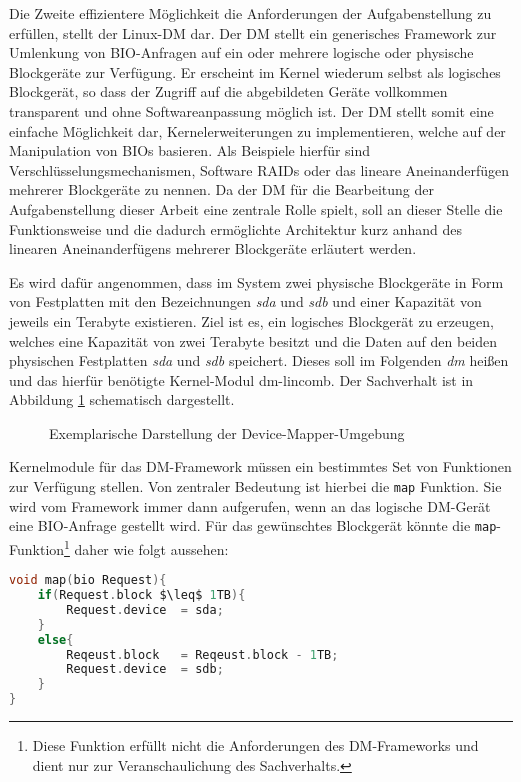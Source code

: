 Die Zweite effizientere Möglichkeit die Anforderungen der Aufgabenstellung zu erfüllen, stellt der Linux-\ac{DM} dar. Der \ac{DM} stellt ein generisches
Framework zur Umlenkung von \ac{BIO}-Anfragen auf ein oder mehrere logische oder physische Blockgeräte zur Verfügung. Er erscheint im Kernel wiederum selbst als logisches
Blockgerät, so dass der Zugriff auf die abgebildeten Geräte vollkommen transparent und ohne Softwareanpassung möglich ist. Der \ac{DM} stellt somit eine einfache
Möglichkeit dar, Kernelerweiterungen zu implementieren, welche auf der Manipulation von \acp{BIO} basieren. Als Beispiele hierfür sind
Verschlüsselungsmechanismen, Software \acp{RAID} oder das lineare Aneinanderfügen mehrerer Blockgeräte zu nennen. Da der \ac{DM} für die Bearbeitung der
Aufgabenstellung dieser Arbeit eine zentrale Rolle spielt, soll an dieser Stelle die Funktionsweise und die dadurch ermöglichte Architektur kurz anhand des
linearen Aneinanderfügens mehrerer Blockgeräte erläutert werden.

Es wird dafür angenommen, dass im System zwei physische Blockgeräte in Form von Festplatten mit den Bezeichnungen \textit{sda} und \textit{sdb} und einer
Kapazität von jeweils ein Terabyte existieren. Ziel ist es, ein logisches Blockgerät zu erzeugen, welches eine Kapazität von zwei Terabyte besitzt und die Daten auf den
beiden physischen Festplatten \textit{sda} und \textit{sdb} speichert. Dieses soll im Folgenden \textit{dm} heißen und das hierfür benötigte Kernel-Modul dm-lincomb. Der
Sachverhalt ist in Abbildung \ref{img:dm1} schematisch dargestellt. 

\begin{figure}[H]\centering
    \caption[Exemplarische Darstellung der Device-Mapper-Umgebung]{Exemplarische Darstellung der Device-Mapper-Umgebung}
    \label{img:dm1}
\end{figure}

Kernelmodule für das \ac{DM}-Framework müssen ein bestimmtes Set von Funktionen zur Verfügung
stellen. Von zentraler Bedeutung ist hierbei die \texttt{map} Funktion. Sie wird vom Framework immer dann aufgerufen, wenn an das logische \ac{DM}-Gerät eine
\ac{BIO}-Anfrage gestellt wird. Für das gewünschtes Blockgerät könnte die \texttt{map}-Funktion\footnote{Diese Funktion erfüllt nicht die Anforderungen des
\ac{DM}-Frameworks und dient nur zur Veranschaulichung des Sachverhalts.} daher wie folgt aussehen:

\begin{lstlisting}[language=C, basicstyle=\footnotesize\ttfamily, keywordstyle=\bfseries, tabsize=4, mathescape=true, caption=\texttt{map}-Funktion des dm-lincomb Moduls] 
void map(bio Request){ 
	if(Request.block $\leq$ 1TB){
		Request.device	= sda; 
	}
	else{
		Reqeust.block	= Reqeust.block - 1TB;
		Request.device	= sdb;
	}
}
\end{lstlisting}

